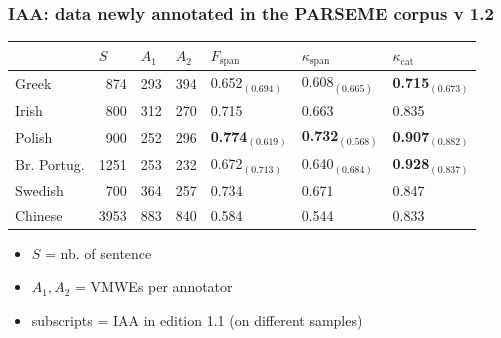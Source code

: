 \documentclass[xcolor=dvipsnames]{beamer}
\begin{document}
\begin{frame}[label={iaa}]
  \vspace*{-5pt}
  \frametitle{IAA: data newly annotated in the PARSEME corpus v 1.2}
  
\setlength{\tabcolsep}{0.5mm}
\begin{tabular}{@{~}l@{~~}l@{~~}l@{~~}l@{~~}l@{~~}l@{~~}l@{~}}
\hline\hline
& $S$& $A_1$&$A_2$& $F_{\text{span}}$ &$\kappa_{\text{span}}$&  $\kappa_{\text{cat}}$\\
\hline
Greek       & ~874 & 293 & 394 & 0.652$_{(0.694)}$ & 0.608$_{(0.665)}$ & \textbf{0.715}$_{(0.673)}$ \\
Irish       & ~800   & 312 & 270 & 0.715 & 0.663 & 0.835 \\
Polish      & ~900 & 252 & 296 & \textbf{0.774}$_{(0.619)}$ & \textbf{0.732}$_{(0.568)}$ & \textbf{0.907}$_{(0.882)}$ \\
Br. Portug.  & 1251 & 253 & 232 & 0.672$_{(0.713)}$ & 0.640$_{(0.684)}$ & \textbf{0.928}$_{(0.837)}$ \\
Swedish     & ~700 & 364 & 257 & 0.734 & 0.671 & 0.847 \\
Chinese    & 3953 & 883 & 840 & 0.584 & 0.544 & 0.833 \\
\hline\hline
\end{tabular}

\begin{itemize}
\item $S$ = nb. of sentence
\item $A_1, A_2$ = VMWEs per annotator
\item subscripts = IAA in edition 1.1 (on different samples)
\end{itemize}

\end{frame}
\end{document}
